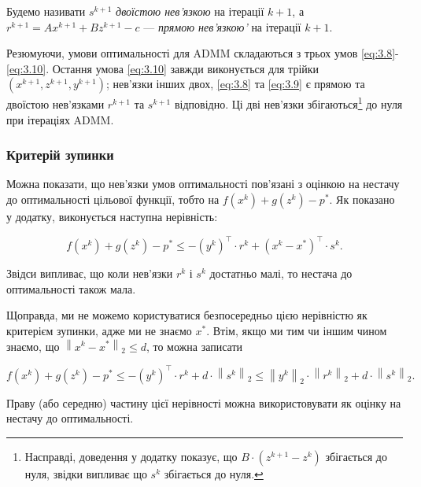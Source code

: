 \begin{definition}
    Будемо називати $s^{k + 1}$ \textit{двоїстою нев'язкою} на ітерації $k + 1$, а $r^{k + 1} = A x^{k + 1} + B z^{k + 1} - c$ --- \textit{прямою нев'язкою'} на ітерації $k + 1$.
\end{definition}

Резюмуючи, умови оптимальності для ADMM складаються з трьох умов \eqref{eq:3.8}-\eqref{eq:3.10}. Остання умова \eqref{eq:3.10} завжди виконується для трійки $ \left( x^{k + 1}, z^{k + 1}, y^{k + 1} \right)$; нев'язки інших двох, \eqref{eq:3.8} та \eqref{eq:3.9} є прямою та двоїстою нев'язками $r^{k + 1}$ та $s^{k + 1}$ відповідно. Ці дві нев'язки збігаються\footnote{Насправді, доведення у додатку показує, що $B \cdot \left( z^{k + 1} - z^k \right)$ збігається до нуля, звідки випливає що $s^k$ збігається до нуля.} до нуля при ітераціях ADMM.

\subsubsection{Критерій зупинки}

Можна показати, що нев'язки умов оптимальності пов'язані з оцінкою на нестачу до оптимальності цільової функції, тобто на $f \left( x^k \right) + g \left( z^k \right) - p^*$. Як показано у додатку, виконується наступна нерівність:

\begin{equation}
	\label{eq:3.11}
	f \left( x^k \right) + g \left( z^k \right) - p^* \le - \left( y^k \right)^\intercal \cdot r^k + \left( x^k - x^* \right)^\intercal \cdot s^k.
\end{equation}

Звідси випливає, що коли нев'язки $r^k$ і $s^k$ достатньо малі, то нестача до оптимальності також мала. \medskip

Щоправда, ми не можемо користуватися безпосередньо цією нерівністю як критерієм зупинки, адже ми не знаємо $x^*$. Втім, якщо ми тим чи іншим чином знаємо, що $\left\| x^k - x^* \right\|_2 \le d$, то можна записати

\begin{equation}
	f \left( x^k \right) + g \left( z^k \right) - p^* \le - \left( y^k \right)^\intercal \cdot r^k + d \cdot \left\|s^k\right\|_2 \le \left\|y^k\right\|_2 \cdot \left\|r^k\right\|_2 + d \cdot \left\|s^k\right\|_2.
\end{equation}

Праву (або середню) частину цієї нерівності можна використовувати як оцінку на нестачу до оптимальності. \medskip

